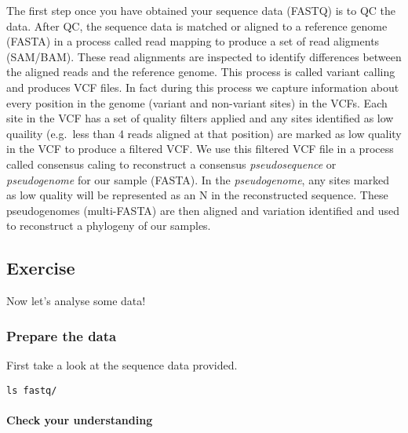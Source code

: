 \documentclass[11pt]{article}
\makeatletter
\newcommand{\boxspacing}{\kern\kvtcb@left@rule\kern\kvtcb@boxsep}
\newcommand{\prompt}[4]{
        {
        \ttfamily\llap{{\color{blue}\LARGE\faKeyboardO\hspace{3pt}#4}}\vspace{-\baselineskip}
	}
    }
\makeatother
\begin{document}
The first step once you have obtained your sequence data (FASTQ) is to
QC the data. After QC, the sequence data is matched or aligned to a
reference genome (FASTA) in a process called read mapping to produce a
set of read aligments (SAM/BAM). These read alignments are inspected to
identify differences between the aligned reads and the reference genome.
This process is called variant calling and produces VCF files. In fact
during this process we capture information about every position in the
genome (variant and non-variant sites) in the VCFs. Each site in the VCF
has a set of quality filters applied and any sites identified as low
quaility (e.g.~less than 4 reads aligned at that position) are marked as
low quality in the VCF to produce a filtered VCF. We use this filtered
VCF file in a process called consensus caling to reconstruct a consensus
\textit{pseudosequence} or \textit{pseudogenome} for our sample (FASTA). In
the \textit{pseudogenome}, any sites marked as low quality will be
represented as an N in the reconstructed sequence. These pseudogenomes
(multi-FASTA) are then aligned and variation identified and used to
reconstruct a phylogeny of our samples.

    \hypertarget{exercise}{%
\subsection{Exercise}\label{exercise}}

Now let's analyse some data!

\hypertarget{prepare-the-data}{%
\subsubsection{Prepare the data}\label{prepare-the-data}}

First take a look at the sequence data provided.

    \begin{tcolorbox}[breakable, size=fbox, boxrule=1pt, pad at break*=1mm,colback=cellbackground, colframe=cellborder]
\prompt{In}{incolor}{ }{\boxspacing}
\begin{Verbatim}[commandchars=\\\{\}]
ls fastq/
\end{Verbatim}
\end{tcolorbox}

    \hypertarget{check-your-understanding}{%
\paragraph{Check your understanding}\label{check-your-understanding}}
\end{document}
